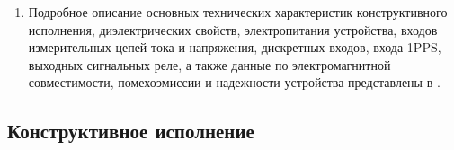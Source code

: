 \begin{enumerate}[label=\arabic{section}.\arabic{subsection}.\arabic*, labelsep=4pt, leftmargin=0pt, itemindent=57pt]
\begin{longtable}
\end{longtable}
\normalsize
\setlength{\extrarowheight}{0.0cm} %


\item
Подробное описание основных технических характеристик конструктивного исполнения, диэлектрических свойств, электропитания устройства, входов измерительных цепей тока и напряжения, дискретных входов, входа 1PPS, выходных сигнальных реле, а также данные по электромагнитной совместимости, помехоэмиссии и надежности устройства представлены в \ManualUnitGeneral.

\end{enumerate}

\color{unidarkgreen}\subsection{Конструктивное исполнение}
\color{black}

